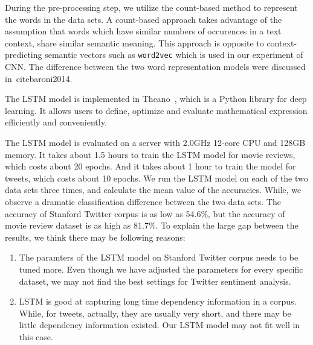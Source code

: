 During the pre-processing step, we utilize the count-based method to represent the words in the data sets. A count-based approach takes advantage of the assumption that words which have similar numbers of occurences in a text context, share similar semantic meaning. This approach is opposite to context-predicting semantic vectors such as {\tt word2vec} which is used in our experiment of CNN. The difference between the two word representation models were discussed in~cite{baroni2014}. 

The LSTM model is implemented in Theano~\cite{bastien2012, bergstra2010}, which is a Python library for deep learning. It allows users to define, optimize and evaluate mathematical expression efficiently and conveniently. 

The LSTM model is evaluated on a server with 2.0GHz 12-core CPU and 128GB memory. It takes about 1.5 hours to train the LSTM model for movie reviews, which costs about 20 epochs. And it takes about 1 hour to train the model for tweets, which costs about 10 epochs. We run the LSTM model on each of the two data sets three times, and calculate the mean value of the accuracies. While, we observe a dramatic classification difference between the two data sets. The accuracy of Stanford Twitter corpus is as low as 54.6\%, but the accuracy of movie review dataset is as high as 81.7\%. To explain the large gap between the results, we think there may be following reasons:

\begin{enumerate}
\item The paramters of the LSTM model on Stanford Twitter corpus needs to be tuned more. Even though we have adjusted the parameters for every specific dataset, we may not find the best settings for Twitter sentiment analysis.
\item LSTM is good at capturing long time dependency information in a corpus. While, for tweets, actually, they are usually very short, and there may be little dependency information existed. Our LSTM model may not fit well in this case.
\end{enumerate}




